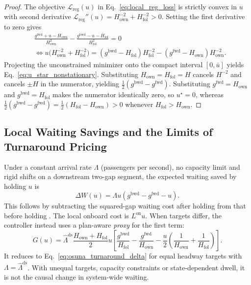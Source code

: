 \begin{proof}
The objective $\mathcal{L}_{\mathrm{reg}}(u)$ in Eq.~\eqref{eq:local_reg_loss} is strictly convex in $u$ with second derivative $\mathcal{L}_{\mathrm{reg}}''(u) = H_{\mathrm{own}}^{-2} + H_{\mathrm{fol}}^{-2} > 0$. Setting the first derivative to zero gives
\begin{align*}
  &\frac{g^{\mathrm{fwd}} + u - H_{\mathrm{own}}}{H_{\mathrm{own}}^2} - \frac{g^{\mathrm{bwd}} - u - H_{\mathrm{fol}}}{H_{\mathrm{fol}}^2} = 0 \\
  &\iff u\bigl(H_{\mathrm{own}}^{-2} + H_{\mathrm{fol}}^{-2}\bigr) = (g^{\mathrm{bwd}} - H_{\mathrm{fol}}) H_{\mathrm{fol}}^{-2} - (g^{\mathrm{fwd}} - H_{\mathrm{own}}) H_{\mathrm{own}}^{-2}.
\end{align*}
Projecting the unconstrained minimizer onto the compact interval $[0, \bar{u}]$ yields Eq.~\eqref{eq:u_star_nonstationary}. Substituting $H_{\mathrm{own}} = H_{\mathrm{fol}} = H$ cancels $H^{-2}$ and cancels $\pm H$ in the numerator, yielding $\frac{1}{2}(g^{\mathrm{bwd}} - g^{\mathrm{fwd}})$. Substituting $g^{\mathrm{fwd}} = H_{\mathrm{own}}$ and $g^{\mathrm{bwd}} = H_{\mathrm{fol}}$ makes the numerator identically zero, so $u^\star = 0$, whereas $\frac{1}{2}(g^{\mathrm{bwd}} - g^{\mathrm{fwd}}) = \frac{1}{2}(H_{\mathrm{fol}} - H_{\mathrm{own}}) > 0$ whenever $H_{\mathrm{fol}} > H_{\mathrm{own}}$.
\end{proof}

\subsection{Local Waiting Savings and the Limits of Turnaround Pricing}
\label{sec:problem_osuna}

Under a constant arrival rate $\Lambda$ (passengers per second), no capacity limit and rigid shifts on a downstream two-gap segment, the expected waiting saved by holding $u$ is
\begin{equation}
  \Delta W(u)=\Lambda u(g^{\mathrm{bwd}}-g^{\mathrm{fwd}}-u).
  \label{eq:osuna_turnaround_delta}
\end{equation}
This follows by subtracting the squared-gap waiting cost after holding from that before holding \citep{osuna1972control}. The local onboard cost is $L^{\mathrm{on}}u$. When targets differ, the controller instead uses a plan-aware \emph{proxy} for the first term:
\begin{equation}
  G(u)=\widehat{\Lambda}^{\mathrm{ds}}\frac{H_{\mathrm{own}}+H_{\mathrm{fol}}}{2}u
  \left[\frac{g^{\mathrm{bwd}}}{H_{\mathrm{fol}}}-\frac{g^{\mathrm{fwd}}}{H_{\mathrm{own}}}
  -\frac{u}{2}\!\left(\frac{1}{H_{\mathrm{own}}}+\frac{1}{H_{\mathrm{fol}}}\right)\right].
  \label{eq:normalized_hold_proxy}
\end{equation}
It reduces to Eq.~\eqref{eq:osuna_turnaround_delta} for equal headway targets with $\Lambda=\widehat{\Lambda}^{\mathrm{ds}}$. With unequal targets, capacity constraints or state-dependent dwell, it is not the causal change in system-wide waiting.

